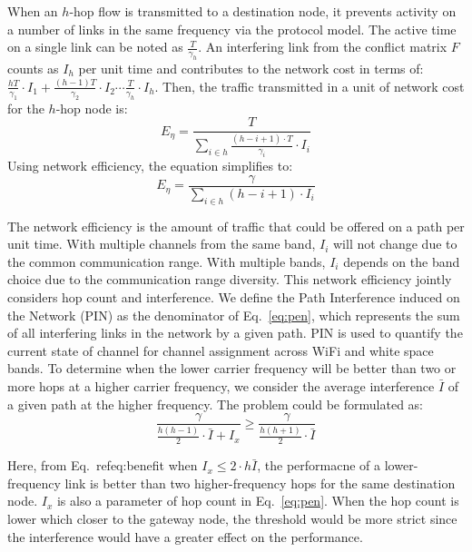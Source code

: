 When an $h$-hop flow is transmitted to a destination node, it prevents 
activity on a number of links in the same frequency via the protocol model. 
The active time on a single link can be noted as 
$\frac{T}{\gamma_h}$. 
An interfering link from the conflict matrix $F$ counts as $I_h$ per unit time
and contributes to the network cost in terms of:
$\frac{hT}{\gamma_1}\cdot I_1 + \frac{(h-1)T}{\gamma_2}\cdot I_2 \cdots \frac{T}{\gamma_h}\cdot I_h$.
Then, the traffic transmitted in a unit of network cost for the $h$-hop node is:
\begin{equation}
\label{eq:originpen}
E_{\eta}=\frac{T}{\sum_{i \in h}\frac{(h-i+1)\cdot T}{\gamma_i}\cdot I_i }
\end{equation}
Using network efficiency, the equation simplifies to:
\begin{equation}
\label{eq:pen}
E_{\eta}=\frac{\gamma}{\sum_{i \in h} (h-i+1)\cdot I_i}
\end{equation}

The network efficiency is the amount of traffic that could be 
offered on a path per unit time. With multiple channels from the same band,
$I_i$ will not change due to the common communication range. With multiple
bands, $I_i$ depends on the band choice due to the communication range diversity.  
This network efficiency jointly considers hop count and interference. We define
the Path Interference induced on the Network (PIN) as the denominator of Eq.~\ref{eq:pen},
which represents the sum of all interfering links in the network by a given path. 
PIN is used to quantify the current state of channel for channel assignment
across WiFi and white space bands.
To determine when the lower carrier frequency will be better than two or more hops at a
higher carrier frequency, we consider the average interference $\bar{I}$ of a given path
at the higher frequency.  The problem could be formulated as:
\begin{equation}
\label{eq:benefit}
\frac{\gamma}{\frac{h(h-1)}{2}\cdot \bar{I}+I_x} \geq \frac{\gamma}{\frac{h(h+1)}{2}\cdot \bar{I}}
\end{equation}

Here, from Eq.~ref{eq:benefit} when $I_x \leq 2\cdot h\bar{I}$, the performacne of a lower-frequency link  
is better than two higher-frequency hops for the same destination node. $I_x$ is also a parameter of hop count 
in Eq.~\ref{eq:pen}. When the hop count is lower which closer to the gateway node, the threshold 
would be more strict since the interference would have a greater effect on the performance.


